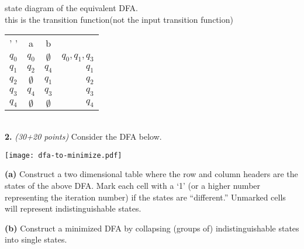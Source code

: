 \documentclass[12pt]{article}
\begin{document}
state diagram of the equivalent DFA.
\\this is the transition function(not the input transition function)
\begin{tabular}{l |c|c| r}
    '  '&a&b\\
    $q_0$&$q_0$ &$\emptyset$ & $q_0,q_1,q_3$\\
    $q_1$& $q_2$&$q_4$ &$q_1$ \\
    $q_2$&$\emptyset$ &$q_1$ & $q_2$\\
    $q_3$& $q_4$&$q_3$ &$q_3$ \\
    $q_4$& $\emptyset$&$\emptyset$ &$q_4$ \\

\end{tabular}
\\

{\bf 2.} {\em (30+20 points)} Consider the DFA below.

\vspace{-0.1in}

\begin{center}
\texttt{[image: dfa-to-minimize.pdf]}
\end{center}

{\bf (a)} Construct a two dimensional table where the row and column
headers are the states of the above DFA. Mark each cell with a `1' (or a
higher number representing the iteration number) if the states are
``different.'' Unmarked cells will represent indistinguishable states.

{\bf (b)} Construct a minimized DFA by collapsing (groups of)
indistinguishable states into single states.
\end{document}

